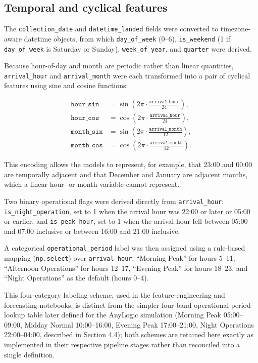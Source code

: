 \subsection{Temporal and cyclical features}
\label{subsec:temporal-cyclical-features}

The \nolinkurl{collection_date} and \nolinkurl{datetime_landed} fields were
converted to timezone-aware datetime objects, from which
\nolinkurl{day_of_week} (0--6),
\nolinkurl{is_weekend} (1 if \nolinkurl{day_of_week} is Saturday or Sunday),
\nolinkurl{week_of_year}, and \nolinkurl{quarter} were derived.

Because hour-of-day and month are periodic rather than linear quantities,
\nolinkurl{arrival_hour} and \nolinkurl{arrival_month} were each transformed
into a pair of cyclical features using sine and cosine functions:

\[
\begin{aligned}
\texttt{hour\_sin}
    &= \sin\left(2\pi \cdot \frac{\texttt{arrival\_hour}}{24}\right), \\
\texttt{hour\_cos}
    &= \cos\left(2\pi \cdot \frac{\texttt{arrival\_hour}}{24}\right), \\
\texttt{month\_sin}
    &= \sin\left(2\pi \cdot \frac{\texttt{arrival\_month}}{12}\right), \\
\texttt{month\_cos}
    &= \cos\left(2\pi \cdot \frac{\texttt{arrival\_month}}{12}\right).
\end{aligned}
\]

This encoding allows the models to represent, for example, that 23:00 and
00:00 are temporally adjacent and that December and January are adjacent
months, which a linear hour- or month-variable cannot represent.

Two binary operational flags were derived directly from
\nolinkurl{arrival_hour}: \nolinkurl{is_night_operation}, set to 1 when the
arrival hour was 22:00 or later or 05:00 or earlier, and
\nolinkurl{is_peak_hour}, set to 1 when the arrival hour fell between 05:00
and 07:00 inclusive or between 16:00 and 21:00 inclusive.

A categorical \nolinkurl{operational_period} label was then assigned using a
rule-based mapping (\nolinkurl{np.select}) over \nolinkurl{arrival_hour}:
``Morning Peak'' for hours 5--11, ``Afternoon Operations'' for hours 12--17,
``Evening Peak'' for hours 18--23, and ``Night Operations'' as the default
(hours 0--4).

This four-category labeling scheme, used in the feature-engineering and
forecasting notebooks, is distinct from the simpler four-band
operational-period lookup table later defined for the AnyLogic simulation
(Morning Peak 05:00--09:00, Midday Normal 10:00--16:00,
Evening Peak 17:00--21:00, Night Operations 22:00--04:00,
described in Section 4.4); both schemes are retained here exactly as
implemented in their respective pipeline stages rather than reconciled into
a single definition.

